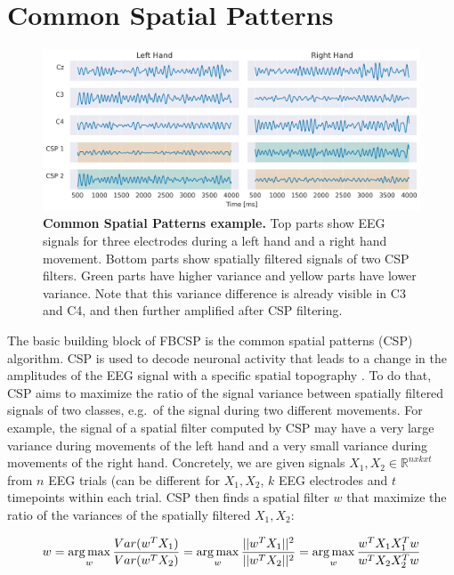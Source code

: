\section{Common Spatial Patterns}\label{common-spatial-patterns}

\begin{figure}[ht]
    \myfloatalign
    \includegraphics[width=1\linewidth]{images/csp_explanation.png}
    \caption[Common Spatial Patterns example.]{
\textbf{Common Spatial Patterns example.} Top parts show EEG
signals for three electrodes during a left hand and a right hand
movement. Bottom parts show spatially filtered signals of two CSP
filters. Green parts have higher variance and yellow parts have lower
variance. Note that this variance difference is already visible in C3 and C4, and then further amplified after CSP filtering.}\label{csp-figure}
\end{figure}




    The basic building block of FBCSP is the common spatial patterns (CSP)
algorithm. CSP is used to decode neuronal activity that leads to a
change in the amplitudes of the EEG signal with a specific spatial
topography \citep{koles_spatial_1990,ramoser_optimal_2000,blankertz_optimizing_2008}.
To do that, CSP aims to maximize the ratio of the signal variance
between spatially filtered signals of two classes, e.g.~of the signal
during two different movements. For example, the signal of a spatial
filter computed by CSP may have a very large variance during movements
of the left hand and a very small variance during movements of the right
hand. Concretely, we are given signals
$X_{1}, X_{2} \in \mathbb{R}^{n x k x t}$ from $n$ EEG trials (can
be different for $X_1, X_2$, $k$ EEG electrodes and $t$
timepoints within each trial. CSP then finds a spatial filter $w$ that
maximize the ratio of the variances of the spatially filtered
$X_1,X_2$:

\begin{equation*}
w=\operatorname*{arg\,max}_w\frac{Var(w^T X_1)}{Var(w^T X_2)}= \operatorname*{arg\,max}_w\frac{||w^T X_1||^2}{||w^T X_2||^2}=\operatorname*{arg\,max}_w\frac{w^T X_1 X_1^T w}{w^T X_2 X_2^T w}
\end{equation*}

